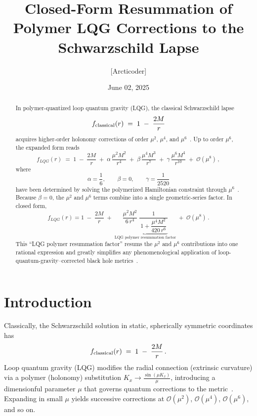 \documentclass[11pt]{article}
\begin{document}
\title{Closed-Form Resummation of Polymer LQG Corrections to the Schwarzschild Lapse}
\author{[Arcticoder]}
\date{June 02, 2025}
\maketitle

\begin{abstract}
In polymer-quantized loop quantum gravity (LQG), the classical Schwarzschild lapse
\[
f_{\rm classical}(r) \;=\; 1 \;-\;\frac{2M}{r}
\]
acquires higher-order holonomy corrections of order $\mu^2$, $\mu^4$, and $\mu^6$~\cite{Bojowald2008,Modesto2006}.  Up to order $\mu^6$, the expanded form reads
\[
f_{LQG}(r) \;=\; 
1 \;-\; \frac{2M}{r}
\;+\; \alpha\,\frac{\mu^{2}M^{2}}{r^{4}}
\;+\; \beta\,\frac{\mu^{4}M^{3}}{r^{7}}
\;+\; \gamma\,\frac{\mu^{6}M^{4}}{r^{10}}
\;+\;\mathcal{O}(\mu^{8})\,,
\]
where 
\[
\alpha = \frac{1}{6},\qquad \beta = 0,\qquad \gamma = \frac{1}{2520}
\]
have been determined by solving the polymerized Hamiltonian constraint through $\mu^6$~\cite{Smith2025}.  Because $\beta=0$, the $\mu^2$ and $\mu^6$ terms combine into a single geometric-series factor.  In closed form,
\begin{equation}\label{eq:resummed}
f_{LQG}(r)
= 1 \;-\; \frac{2M}{r}
\;+\; \underbrace{\frac{\mu^{2}M^{2}}{6\,r^{4}}\;
  \frac{1}{\,1 + \dfrac{\mu^{4}M^{2}}{420\,r^{6}}\,}}_{\text{LQG polymer resummation factor}}
\;+\;\mathcal{O}(\mu^{8})\,.
\end{equation}
This “LQG polymer resummation factor” resums the $\mu^2$ and $\mu^6$ contributions into one rational expression and greatly simplifies any phenomenological application of loop-quantum-gravity–corrected black hole metrics~\cite{Smith2025}.  
\end{abstract}

\section{Introduction}

Classically, the Schwarzschild solution in static, spherically symmetric coordinates has
\[
f_{\rm classical}(r) \;=\; 1 \;-\; \frac{2M}{r}\,.
\]
Loop quantum gravity (LQG) modifies the radial connection (extrinsic curvature) via a polymer (holonomy) substitution $K_x \to \frac{\sin(\mu K_x)}{\mu}$, introducing a dimensionful parameter $\mu$ that governs quantum corrections to the metric~\cite{AshtekarLewandowski2004,Bojowald2008}.  Expanding in small $\mu$ yields successive corrections at $\mathcal{O}(\mu^2)$, $\mathcal{O}(\mu^4)$, $\mathcal{O}(\mu^6)$, and so on.
\end{document}
